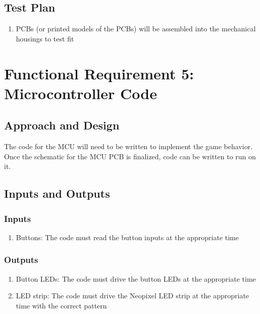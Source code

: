 \documentclass{notes}
\begin{document}
\subsection{Test Plan}

\begin{enumerate}
    \item PCBs (or printed models of the PCBs) will be assembled into the mechanical housings to test fit
\end{enumerate}

\section{Functional Requirement 5: Microcontroller Code}

\subsection{Approach and Design}

The code for the MCU will need to be written to implement the game behavior.
Once the schematic for the MCU PCB is finalized, code can be written to run on it.

\subsection{Inputs and Outputs}

\subsubsection{Inputs}

\begin{enumerate}
    \item Buttons: The code must read the button inputs at the appropriate time
\end{enumerate}

\subsubsection{Outputs}

\begin{enumerate}
    \item Button LEDs: The code must drive the button LEDs at the appropriate time
    \item LED strip: The code must drive the Neopixel LED strip at the appropriate time with the correct pattern
\end{enumerate}
\end{document}
